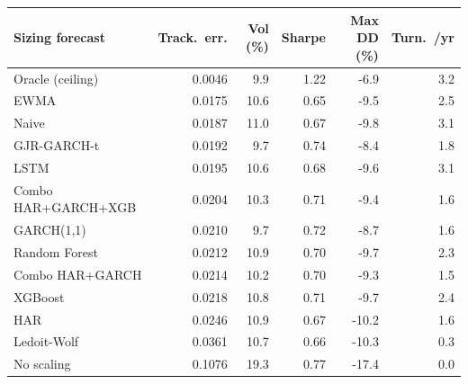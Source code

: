 \begin{tabular}{lrrrrr}
\hline
Sizing forecast & Track.\ err. & Vol (\%) & Sharpe & Max DD (\%) & Turn.\ /yr \\
\hline
Oracle (ceiling) & 0.0046 & 9.9 & 1.22 & -6.9 & 3.2 \\
EWMA & 0.0175 & 10.6 & 0.65 & -9.5 & 2.5 \\
Naive & 0.0187 & 11.0 & 0.67 & -9.8 & 3.1 \\
GJR-GARCH-t & 0.0192 & 9.7 & 0.74 & -8.4 & 1.8 \\
LSTM & 0.0195 & 10.6 & 0.68 & -9.6 & 3.1 \\
Combo HAR+GARCH+XGB & 0.0204 & 10.3 & 0.71 & -9.4 & 1.6 \\
GARCH(1,1) & 0.0210 & 9.7 & 0.72 & -8.7 & 1.6 \\
Random Forest & 0.0212 & 10.9 & 0.70 & -9.7 & 2.3 \\
Combo HAR+GARCH & 0.0214 & 10.2 & 0.70 & -9.3 & 1.5 \\
XGBoost & 0.0218 & 10.8 & 0.71 & -9.7 & 2.4 \\
HAR & 0.0246 & 10.9 & 0.67 & -10.2 & 1.6 \\
Ledoit-Wolf & 0.0361 & 10.7 & 0.66 & -10.3 & 0.3 \\
No scaling & 0.1076 & 19.3 & 0.77 & -17.4 & 0.0 \\
\hline
\end{tabular}
